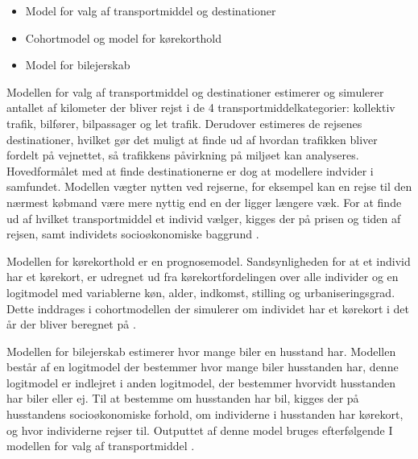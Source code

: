 \begin{itemize}
\item Model for valg af transportmiddel og destinationer
\item Cohortmodel og model for kørekorthold
\item Model for bilejerskab
\end{itemize}

Modellen for valg af transportmiddel og destinationer estimerer og simulerer antallet af kilometer der bliver rejst i de 4 transportmiddelkategorier: kollektiv trafik, bilfører, bilpassager og let trafik. Derudover estimeres de rejsenes destinationer, hvilket gør det muligt at finde ud af hvordan trafikken bliver fordelt på vejnettet, så trafikkens påvirkning på miljøet kan analyseres. Hovedformålet med at finde destinationerne er dog at modellere indvider i samfundet. Modellen vægter nytten ved rejserne, for eksempel kan en rejse til den nærmest købmand være mere nyttig end en der ligger længere væk. For at finde ud af hvilket transportmiddel et individ vælger, kigges der på prisen og tiden af rejsen, samt individets socioøkonomiske baggrund \cite[s. 26-27]{dmumodelanalyser}.

\vspace{5mm}

Modellen for kørekorthold er en prognosemodel. Sandsynligheden for at et individ har et kørekort, er udregnet ud fra kørekortfordelingen over alle individer og en logitmodel med variablerne køn, alder, indkomst, stilling og urbaniseringsgrad. Dette inddrages i cohortmodellen der simulerer om individet har et kørekort i det år der bliver beregnet på \cite[s. 30]{dmumodelanalyser}.

\vspace{5mm}

Modellen for bilejerskab estimerer hvor mange biler en husstand har. Modellen består af en logitmodel der bestemmer hvor mange biler husstanden har, denne logitmodel er indlejret i anden logitmodel, der bestemmer hvorvidt husstanden har biler eller ej. Til at bestemme om husstanden har bil, kigges der på husstandens socioøkonomiske forhold, om individerne i husstanden har kørekort, og hvor individerne rejser til. Outputtet af denne model bruges efterfølgende I modellen for valg af transportmiddel \cite[s. 29-30]{dmumodelanalyser}.


